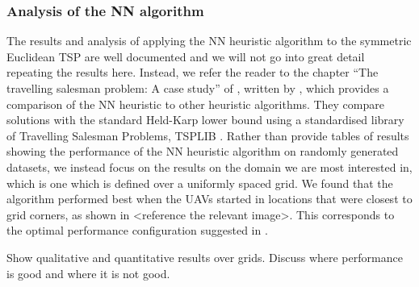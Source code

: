 \subsubsection{Analysis of the NN algorithm}
The results and analysis of applying the NN heuristic algorithm to the symmetric Euclidean TSP are well documented and we will not go into great detail repeating the results here. Instead, we refer the reader to the chapter ``The travelling salesman problem: A case study'' of \cite{Aarts:1997:LSC:549160}, written by \citeauthor{Johnson1995TheOptimization}, which provides a comparison of the NN heuristic to other heuristic algorithms. They compare solutions with the standard Held-Karp lower bound \cite{Held1962AProblems} using a standardised library of Travelling Salesman Problems, TSPLIB \cite{TSPLIB}. Rather than provide tables of results showing the performance of the NN heuristic algorithm on randomly generated datasets, we instead focus on the results on the domain we are most interested in, which is one which is defined over a uniformly spaced grid. We found that the algorithm performed best when the UAVs started in locations that were closest to grid corners, as shown in <reference the relevant image>. This corresponds to the optimal performance configuration suggested in \cite{Hungerlander2018TheGrids}.

Show qualitative and quantitative results over grids. Discuss where performance is good and where it is not good.



































